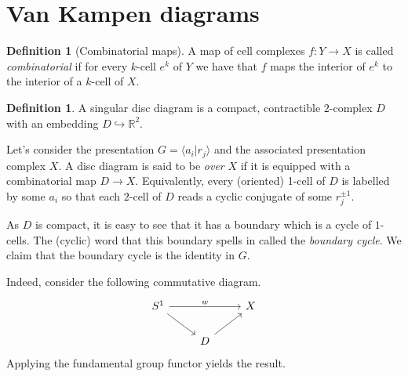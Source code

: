 \documentclass{report}
\theoremstyle{definition}
\theoremstyle{plain}
\theoremstyle{definition}
\newtheorem{defn}[thm]{Definition}
\begin{document}
	\section{Van Kampen diagrams}
	\begin{defn}[Combinatorial maps]
		A map of cell complexes $f\colon Y \to X$ is called \emph{combinatorial} if for every $k$-cell $e^k$ of $Y$ we have that $f$ maps the interior of $e^k$ to the interior of a $k$-cell of $X$.
	\end{defn}
	\begin{defn}
		A singular disc diagram is a compact, contractible $2$-complex $D$ with an embedding $D\hookrightarrow \mathbb{R}^2$.
	\end{defn}
	Let's consider the presentation $G= \langle a_i | r_j\rangle$ and the associated presentation complex $X$. A disc diagram is said to be \emph{over} $X$ if it is equipped with a combinatorial map $D\to X$. Equivalently, every (oriented) 1-cell of $D$ is labelled by some $a_i$ so that each $2$-cell of $D$ reads a cyclic conjugate of some $r_j^{\pm 1}$.
	
	As $D$ is compact, it is easy to see that it has a boundary which is a cycle of $1$-cells. The (cyclic) word that this boundary spells in called the \emph{boundary cycle}. We claim that the boundary cycle is the identity in $G$.
	
	Indeed, consider the following commutative diagram.
	\[\begin{tikzcd}
		{S^1} && X \\
		& D
		\arrow["w", from=1-1, to=1-3]
		\arrow[from=1-1, to=2-2]
		\arrow[from=2-2, to=1-3]
	\end{tikzcd}\]
	Applying the fundamental group functor yields the result.
\end{document}
